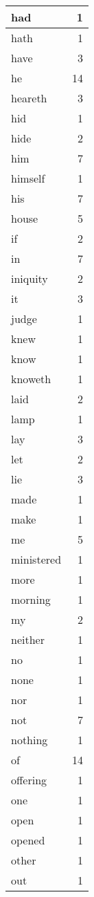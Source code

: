 \begin{center}
\begin{longtable}{l|r}
had & 1 \\ \hline
hath & 1 \\ \hline
have & 3 \\ \hline
he & 14 \\ \hline
heareth & 3 \\ \hline
hid & 1 \\ \hline
hide & 2 \\ \hline
him & 7 \\ \hline
himself & 1 \\ \hline
his & 7 \\ \hline
house & 5 \\ \hline
if & 2 \\ \hline
in & 7 \\ \hline
iniquity & 2 \\ \hline
it & 3 \\ \hline
judge & 1 \\ \hline
knew & 1 \\ \hline
know & 1 \\ \hline
knoweth & 1 \\ \hline
laid & 2 \\ \hline
lamp & 1 \\ \hline
lay & 3 \\ \hline
let & 2 \\ \hline
lie & 3 \\ \hline
made & 1 \\ \hline
make & 1 \\ \hline
me & 5 \\ \hline
ministered & 1 \\ \hline
more & 1 \\ \hline
morning & 1 \\ \hline
my & 2 \\ \hline
neither & 1 \\ \hline
no & 1 \\ \hline
none & 1 \\ \hline
nor & 1 \\ \hline
not & 7 \\ \hline
nothing & 1 \\ \hline
of & 14 \\ \hline
offering & 1 \\ \hline
one & 1 \\ \hline
open & 1 \\ \hline
opened & 1 \\ \hline
other & 1 \\ \hline
out & 1 \\ \hline

\end{longtable}
\end{center}
